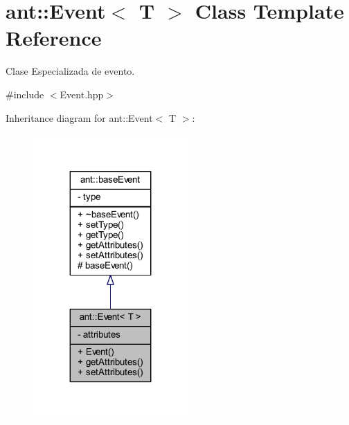 \hypertarget{classant_1_1_event}{\section{ant\+:\+:Event$<$ T $>$ Class Template Reference}
\label{classant_1_1_event}
}


Clase Especializada de evento.  




{\ttfamily \#include $<$Event.\+hpp$>$}



Inheritance diagram for ant\+:\+:Event$<$ T $>$\+:
\nopagebreak
\begin{figure}[H]
\begin{center}
\leavevmode
\includegraphics[width=167pt]{d8/d5c/classant_1_1_event__inherit__graph}
\end{center}
\end{figure}


